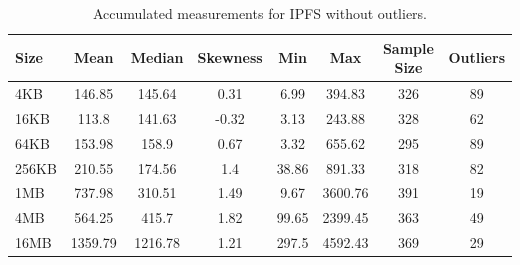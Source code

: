 \begin{table}[H]
\centering
\begin{small}
\caption{Accumulated measurements for each experiment in IPFS without outliers (degroot-miletus-nancy).}
\label{tab:miletus_degroot_nancy}
\end{small}
\end{table}

\begin{table}[H]
\centering
\begin{small}
\caption{Accumulated measurements for IPFS without outliers.}
\begin{tabular}{@{}lccccccc@{}}
\toprule
Size & Mean & Median & Skewness & Min & Max & Sample Size & Outliers \\ \midrule
4KB & 146.85 & 145.64 & 0.31 & 6.99 & 394.83 & 326 & 89\\
16KB & 113.8 & 141.63 & -0.32 & 3.13 & 243.88 & 328 & 62\\
64KB & 153.98 & 158.9 & 0.67 & 3.32 & 655.62 & 295 & 89\\
256KB & 210.55 & 174.56 & 1.4 & 38.86 & 891.33 & 318 & 82\\
1MB & 737.98 & 310.51 & 1.49 & 9.67 & 3600.76 & 391 & 19\\
4MB & 564.25 & 415.7 & 1.82 & 99.65 & 2399.45 & 363 & 49\\
16MB & 1359.79 & 1216.78 & 1.21 & 297.5 & 4592.43 & 369 & 29\\
\bottomrule
\end{tabular}
\end{small}
\end{table}

